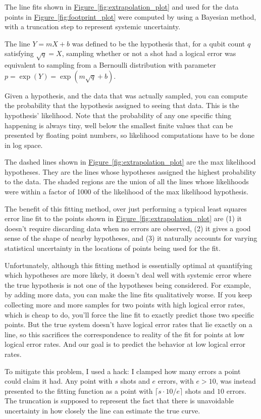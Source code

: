 \documentclass[onecolumn,unpublished,a4paper]{quantumarticle}
\theoremstyle{definition}
\theoremstyle{definition}
\theoremstyle{definition}
\newcommand{\fig}[1]{\hyperref[fig:#1]{Figure~\ref*{fig:#1}}}
\begin{document}
The line fits shown in \fig{extrapolation_plot} and used for the data points in \fig{footprint_plot} were computed by using a Bayesian method, with a truncation step to represent systemic uncertainty.

The line $Y = mX + b$ was defined to be the hypothesis that, for a qubit count $q$ satisfying $\sqrt{q} = X$, sampling whether or not a shot had a logical error was equivalent to sampling from a Bernoulli distribution with parameter $p=\exp(Y)=\exp(m \sqrt{q} + b)$.

Given a hypothesis, and the data that was actually sampled, you can compute the probability that the hypothesis assigned to seeing that data.
This is the hypothesis' likelihood.
Note that the probability of any one specific thing happening is always tiny, well below the smallest finite values that can be presented by floating point numbers, so likelihood computations have to be done in log space.

The dashed lines shown in \fig{extrapolation_plot} are the max likelihood hypotheses.
They are the lines whose hypotheses assigned the highest probability to the data.
The shaded regions are the union of all the lines whose likelihoods were within a factor of 1000 of the likelihood of the max likelihood hypothesis.

The benefit of this fitting method, over just performing a typical least squares error line fit to the points shown in \fig{extrapolation_plot} are (1) it doesn't require discarding data when no errors are observed, (2) it gives a good sense of the shape of nearby hypotheses, and (3) it naturally accounts for varying statistical uncertainty in the locations of points being used for the fit.

Unfortunately, although this fitting method is essentially optimal at quantifying which hypotheses are more likely, it doesn't deal well with systemic error where the true hypothesis is not one of the hypotheses being considered.
For example, by adding more data, you can make the line fits qualitatively worse.
If you keep collecting more and more samples for two points with high logical error rates, which is cheap to do, you'll force the line fit to exactly predict those two specific points.
But the true system doesn't have logical error rates that lie exactly on a line, so this sacrifices the correspondence to reality of the fit for points at low logical error rates.
And our goal is to predict the behavior at low logical error rates.

To mitigate this problem, I used a hack: I clamped how many errors a point could claim it had.
Any point with $s$ shots and $e$ errors, with $e > 10$, was instead presented to the fitting function as a point with $\lceil s \cdot 10/e \rceil$ shots and $10$ errors.
The truncation is supposed to represent the fact that there is unavoidable uncertainty in how closely the line can estimate the true curve.
\end{document}
